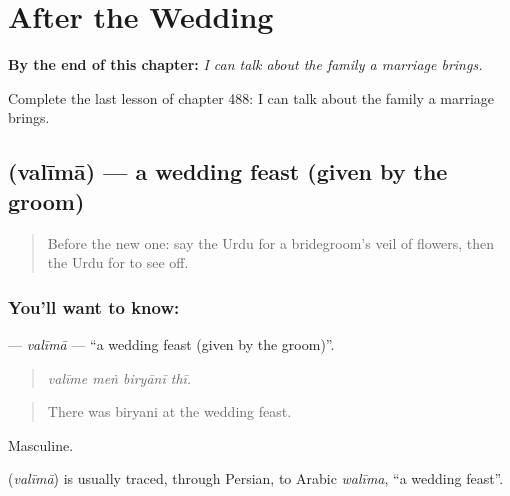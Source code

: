 
\chapter{After the Wedding}
\label{ch:ur-after-the-wedding}

\begin{chapteropening}
\textbf{By the end of this chapter:} \emph{I can talk about the family a marriage brings.}

Complete the last lesson of chapter 488: I can talk about the family a marriage brings.
\end{chapteropening}

\section[\texorpdfstring{\ur{ولیمہ} (valīmā)}{ولیمہ (valīmā)}]{ (valīmā) — a wedding feast (given by the groom)}

\label{lesson:UR-C488-valima}



\begin{quote}
Before the new one: say the Urdu for a bridegroom's veil of flowers, then the Urdu for to see off.
\end{quote}

\subsection*{You'll want to know: }
\textbf{} — \emph{valīmā} — \textquotedblleft{}a wedding feast (given by the groom)\textquotedblright{}.

\begin{quote}
   
\end{quote}

\begin{quote}
\emph{valīme meṅ biryānī thī.}
\end{quote}

\begin{quote}
There was biryani at the wedding feast.
\end{quote}

Masculine.

\begin{cousinweb}
\textbf{} (\emph{valīmā}) is usually traced, through Persian, to Arabic \emph{walīma}, \textquotedblleft{}a wedding feast\textquotedblright{}.
\end{cousinweb}

